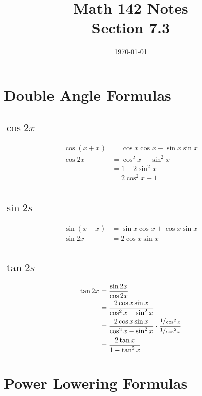 \documentclass{exam}
\title{Math 142 Notes \\ Section 7.3}
\date{\today}
\begin{document}
  \maketitle
  \tableofcontents

  \section{Double Angle Formulas}

  \subsection{$\cos 2x$}
  \begin{align*}
    \cos(x + x) & = \cos x \cos x - \sin x \sin x \\
    \cos 2x     & = \cos^2 x - \sin^2 x \\
                & = 1 - 2 \sin^2 x \\
                & = 2 \cos^2 x - 1 \\
  \end{align*}

  \subsection{$\sin 2s$}
  \begin{align*}
    \sin(x + x) & = \sin x \cos x + \cos x \sin x \\
    \sin 2x     & = 2 \cos x \sin x \\
  \end{align*}

  \subsection{$\tan 2s$}
  \begin{align*}
    \tan 2x & = \frac{\sin 2x}{\cos 2x} \\
            & = \frac{2 \cos x \sin x}{\cos^2 x - \sin^2 x} \\
            & = \frac{2 \cos x \sin x}{\cos^2 x - \sin^2 x} \cdot \frac{\sfrac{1}{\cos^2 x}}{\sfrac{1}{\cos^2 x}} \\
            & = \frac{2 \tan x}{1 - \tan^2 x} \\
  \end{align*}

  \section{Power Lowering Formulas}
\end{document}
